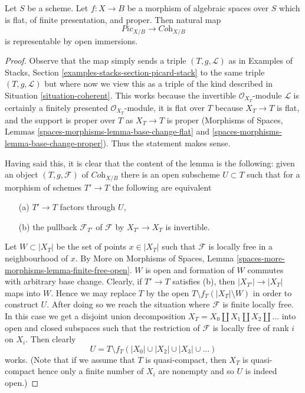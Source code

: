 \begin{lemma}
\label{lemma-picard-stack-open-in-coh}
Let $S$ be a scheme. Let $f : X \to B$ be a morphism of algebraic spaces
over $S$ which is flat, of finite presentation, and proper.
Then natural map
$$
\textit{Pic}_{X/B} \longrightarrow \textit{Coh}_{X/B}
$$
is representable by open immersions.
\end{lemma}

\begin{proof}
Observe that the map simply sends a triple $(T, g, \mathcal{L})$
as in Examples of Stacks, Section \ref{examples-stacks-section-picard-stack}
to the same triple $(T, g, \mathcal{L})$ but where now we view
this as a triple of the kind described in
Situation \ref{situation-coherent}.
This works because the invertible $\mathcal{O}_{X_T}$-module
$\mathcal{L}$ is certainly a finitely presented $\mathcal{O}_{X_T}$-module,
it is flat over $T$ because $X_T \to T$ is flat, and the support is
proper over $T$ as $X_T \to T$ is proper
(Morphisms of Spaces, Lemmas \ref{spaces-morphisms-lemma-base-change-flat}
and \ref{spaces-morphisms-lemma-base-change-proper}).
Thus the statement makes sense.

\medskip\noindent
Having said this, it is clear that the content of the lemma is the
following: given an object $(T, g, \mathcal{F})$ of
$\textit{Coh}_{X/B}$ there is an open subscheme $U \subset T$
such that for a morphism of schemes $T' \to T$ the following
are equivalent
\begin{enumerate}
\item[(a)] $T' \to T$ factors through $U$,
\item[(b)] the pullback $\mathcal{F}_{T'}$ of
$\mathcal{F}$ by $X_{T'} \to X_T$ is invertible.
\end{enumerate}
Let $W \subset |X_T|$ be the set of points $x \in |X_T|$
such that $\mathcal{F}$ is locally free in a neighbourhood of $x$. By
More on Morphisms of Spaces, Lemma
\ref{spaces-more-morphisms-lemma-finite-free-open}.
$W$ is open and formation
of $W$ commutes with arbitrary base change.
Clearly, if $T' \to T$ satisfies (b), then $|X_{T'}| \to |X_T|$
maps into $W$. Hence we may replace $T$ by the open
$T \setminus f_T(|X_T| \setminus W)$ in order
to construct $U$. After doing so we reach the situation
where $\mathcal{F}$ is finite locally free.
In this case we get a disjoint union decomposition
$X_T = X_0 \amalg X_1 \amalg X_2 \amalg \ldots$
into open and closed subspaces such that the restriction of
$\mathcal{F}$ is locally free of rank $i$ on $X_i$. Then clearly
$$
U = T \setminus f_T(|X_0| \cup |X_2| \cup |X_3| \cup \ldots )
$$
works. (Note that if we assume that $T$ is quasi-compact, then
$X_T$ is quasi-compact hence only a finite number of $X_i$
are nonempty and so $U$ is indeed open.)
\end{proof}

